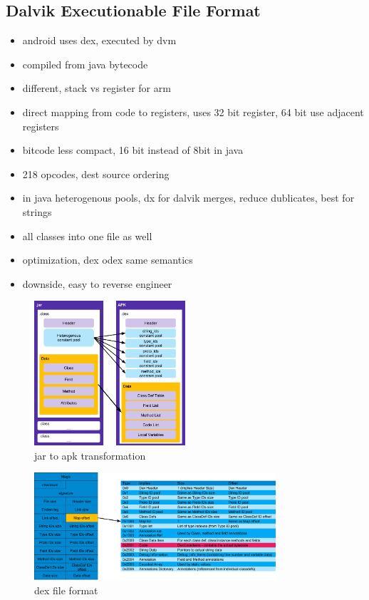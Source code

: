\subsection{Dalvik Executionable File Format} \label{subsection:android-dex}
\begin{itemize}
    \item android uses dex, executed by dvm
    \item compiled from java bytecode
    \item different, stack vs register for arm
    \item direct mapping from code to registers, uses 32 bit register, 64 bit use adjacent registers
    \item bitcode less compact, 16 bit instead of 8bit in java
    \item 218 opcodes, dest source ordering
    \item in java heterogenous pools, dx for dalvik merges, reduce dublicates, best for strings
    \item all classes into one file as well
    \item optimization, dex odex same semantics
    \item downside, easy to reverse engineer
\end{itemize}
\begin{figure}[h]
    \centering
    \includegraphics[width=0.5\textwidth]{data/java.png}
    \caption{\gls{jar} to \gls{apk} transformation \cite{googleDalvik}}
    \label{fig:java}
\end{figure}

\begin{figure}[h]
    \centering
    \includegraphics[width=0.8\textwidth]{data/dex.png}
    \caption{\gls{dex} file format \cite{andevconDalvikART}}
    \label{fig:dex}
\end{figure}
